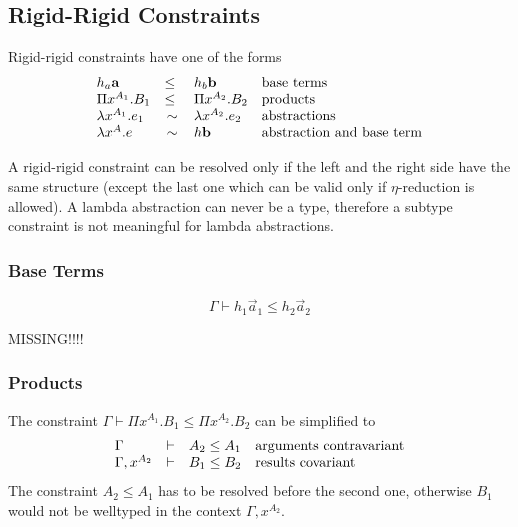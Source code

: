 \subsection{Rigid-Rigid Constraints}

Rigid-rigid constraints have one of the forms
$$
    \begin{array}{lllll} 
        h_a {\mathbf a} &\le& h_b {\mathbf b}
        & \text{base terms}
        \\
        \Pi x^{A_1}. B_1 &\le& \Pi x^{A_2}. B_2
        & \text{products}
        \\
        \lambda x^{A_1}. e_1 &\,\sim\,& \lambda x^{A_2}. e_2
        & \text{abstractions}
        \\
        \lambda x^A. e & \,\sim\, & h {\mathbf b}
        & \text{abstraction and base term}
     \end{array}
$$

A rigid-rigid constraint can be resolved only if the left and the right side
have the same structure (except the last one which can be valid only if
$\eta$-reduction is allowed). A lambda abstraction can never be a type,
therefore a subtype constraint is not meaningful for lambda abstractions.








\subsubsection{Base Terms}


$$
    \Gamma \vdash h_1 \vec a_1 \le h_2 \vec a_2
$$

MISSING!!!!


\subsubsection{Products}

The constraint $\Gamma \vdash \Pi x^{A_1}. B_1 \le \Pi x^{A_2}. B_2$ can be
simplified to
$$
    \begin{array}{lllll} 
        \Gamma          & \vdash & A_2 \le A_1
        &\text{arguments contravariant}
        \\
        \Gamma, x^{A_2} & \vdash & B_1 \le B_2
        &\text{results covariant}
     \end{array}
$$
%
The constraint $A_2 \le A_1$ has to be resolved before the second one,
otherwise $B_1$ would not be welltyped in the context $\Gamma, x^{A_2}$.

